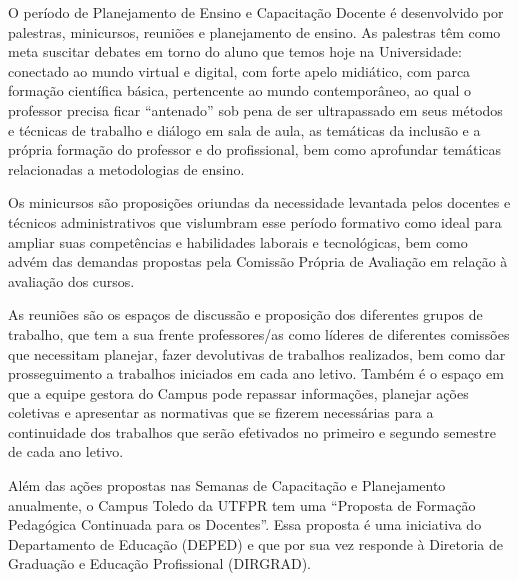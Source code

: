 O período de Planejamento de Ensino e Capacitação Docente é desenvolvido por palestras, minicursos, reuniões e planejamento de ensino. As palestras têm como meta suscitar debates em torno do aluno que temos hoje na Universidade: conectado ao mundo virtual e digital, com forte apelo midiático, com parca formação científica básica, pertencente ao mundo contemporâneo, ao qual o professor precisa ficar ``antenado'' sob pena de ser ultrapassado em seus métodos e técnicas de trabalho e diálogo em sala de aula, as temáticas da inclusão e a própria formação do professor e do profissional, bem como aprofundar temáticas relacionadas a metodologias de ensino.

Os minicursos são proposições oriundas da necessidade levantada pelos docentes e técnicos administrativos que vislumbram esse período formativo como ideal para ampliar suas competências e habilidades laborais e tecnológicas, bem como advém das demandas propostas pela Comissão Própria de Avaliação em relação à avaliação dos cursos.

As reuniões são os espaços de discussão e proposição dos diferentes grupos de trabalho, que tem a sua frente professores/as como líderes de diferentes comissões que necessitam planejar, fazer devolutivas de trabalhos realizados, bem como dar prosseguimento a trabalhos iniciados em cada ano letivo. Também é o espaço em que a equipe gestora do Campus pode repassar informações, planejar ações coletivas e apresentar as normativas que se fizerem necessárias para a continuidade dos trabalhos que serão efetivados no primeiro e segundo semestre de cada ano letivo.

Além das ações propostas nas Semanas de Capacitação e Planejamento anualmente, o Campus Toledo da UTFPR tem uma ``Proposta de Formação Pedagógica Continuada para os Docentes''. Essa proposta é uma iniciativa do Departamento de Educação (DEPED) e que por sua vez responde à Diretoria de Graduação e Educação Profissional (DIRGRAD).